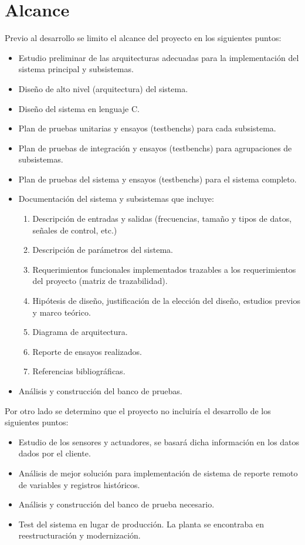 \section{ Alcance }

Previo al desarrollo se limito el alcance del proyecto en los siguientes puntos:
\begin{itemize}
	\item Estudio preliminar de las arquitecturas adecuadas para la implementación del sistema principal y subsistemas.
	\item Diseño de alto nivel (arquitectura) del sistema.
	\item Diseño del sistema en lenguaje C.
	\item Plan de pruebas unitarias y ensayos (testbenchs) para cada subsistema.
	\item Plan de pruebas de integración y ensayos (testbenchs) para agrupaciones de subsistemas.
	\item Plan de pruebas del sistema y ensayos (testbenchs) para el sistema completo.
	\item Documentación del sistema y subsistemas que incluye:
	\begin{enumerate}
		\item Descripción de entradas y salidas (frecuencias, tamaño y tipos de datos, señales de control, etc.)
		\item Descripción de parámetros del sistema.
		\item Requerimientos funcionales implementados trazables a los requerimientos del proyecto (matriz de trazabilidad).
		\item Hipótesis de diseño, justificación de la elección del diseño, estudios previos y marco teórico.
		\item Diagrama de arquitectura.
		\item Reporte de ensayos realizados.
		\item Referencias bibliográficas.
	\end{enumerate}
	\item Análisis y construcción del banco de pruebas.
\end{itemize}
\hspace{1px}

Por otro lado se determino que el proyecto no incluiría el desarrollo de los siguientes puntos: 
\begin{itemize}
	\item Estudio de los sensores y actuadores, se basará dicha información en los datos dados por el cliente. 
	\item Análisis de mejor solución para implementación de sistema de reporte remoto de variables y registros históricos.
	\item Análisis y construcción del banco de prueba necesario.
	\item Test del sistema en lugar de producción. La planta se encontraba en reestructuración y modernización.
\end{itemize}








